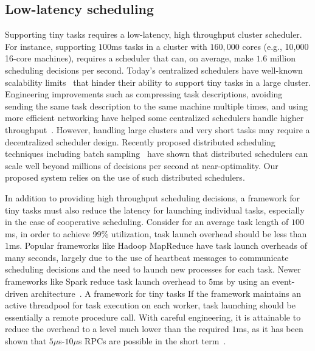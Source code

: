\subsection{Low-latency scheduling}
Supporting tiny tasks requires a low-latency, high throughput cluster scheduler.
For instance, supporting $100$ms tasks in a cluster with $160,000$ cores
(e.g., 10,000 16-core machines),
requires a scheduler that can, on average, make $1.6$ million scheduling
decisions per second.
Today's centralized schedulers have well-known scalability
limits~\cite{wilkesberkeley} that
hinder their ability to support tiny tasks in a large cluster.
Engineering improvements such as compressing task descriptions,
avoiding sending the same task description to the same machine multiple
times, and using more efficient networking have helped some
centralized schedulers
handle higher throughput~\cite{zaharia2012meetup}.
However, handling large clusters and very
short tasks may require a decentralized scheduler design.
Recently proposed distributed scheduling techniques including batch
sampling~\cite{ousterhoutbatch} have shown that distributed schedulers
can scale well beyond millions of decisions per second at near-optimality.
Our proposed system relies on the use of such distributed schedulers.

In addition to providing high throughput scheduling decisions, a framework for
tiny tasks must also reduce the latency for launching individual tasks,
especially in the case of cooperative scheduling.
Consider for an average task length of $100$ms, in order to achieve 99\% utilization,
task launch overhead should be less than $1$ms.
Popular frameworks like Hadoop MapReduce
have task launch overheads of many seconds, largely due to the use of
heartbeat messages to communicate scheduling decisions and the need to launch new
processes for each task.
Newer frameworks like Spark reduce task launch overhead to $5$ms
by using an event-driven architecture~\cite{shark-tr}.
A framework for tiny tasks 
If the framework maintains an active threadpool for task execution on each worker,
task launching should be essentially a remote procedure call.
With careful engineering,
it is attainable to reduce the overhead to a level much lower than the
required $1$ms, as it has been shown that $5\mu$s-$10\mu$s RPCs are possible
in the short term~\cite{low-latency}.

